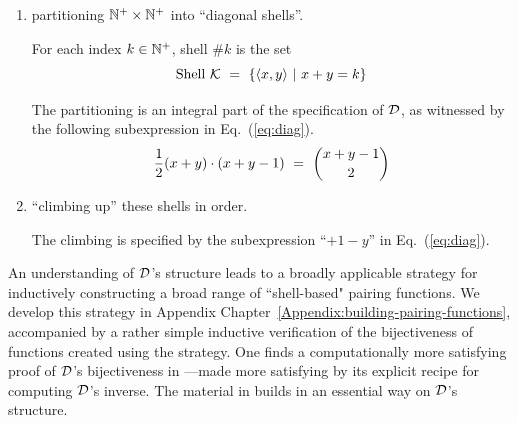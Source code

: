 \begin{enumerate}
\item
partitioning $\mathbb{N}^+ \times \mathbb{N}^+$ into ``diagonal shells''.

\smallskip

For each index $k \in \mathbb{N}^+$, shell \#$k$ is the set
\[ \mbox{Shell } \mbox{$\cal K$} \ = \ \{ \langle x,y \rangle \ | \ x+y = k \} \]

\smallskip

The partitioning is an integral part of the specification of $\mbox{$\cal D$}$, as witnessed by the following subexpression in Eq.~(\ref{eq:diag}).
\[ {1 \over 2} (x+y) \cdot (x+y-1) \ = \ {{x+y-1} \choose 2} \]

\medskip\item
``climbing up'' these shells in order.

\smallskip

The climbing is specified by the subexpression ``$+1-y$'' in Eq.~(\ref{eq:diag}).
\end{enumerate}
\bigskip

\noindent {}

\bigskip

An understanding of $\mbox{$\cal D$}$'s structure leads to a broadly applicable strategy for inductively constructing a broad range of ``shell-based" pairing functions.  We develop this strategy in Appendix Chapter~\ref{Appendix:building-pairing-functions}, accompanied by a rather simple inductive verification of the bijectiveness of functions created using the strategy.  One finds a computationally more satisfying proof of $\mbox{$\cal D$}$'s bijectiveness in \cite{Davis58}---made more satisfying by its explicit recipe for computing $\mbox{$\cal D$}$'s inverse.  The material in \cite{Davis58} builds in an essential way on $\mbox{$\cal D$}$'s structure.

\bigskip

